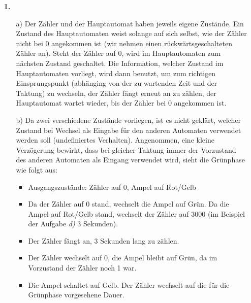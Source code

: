 \documentclass[a4paper,10pt]{scrartcl}
\author{\authorinfo}
\title{\titleinfo}
\date{\today}
\begin{document}
\setcounter{secnumdepth}{0}
\maketitle


\begin{enumerate}
    \item[\textbf{1.}]
        \begin{enumerate}
            \item[a)]
                Der Zähler und der Hauptautomat haben jeweils eigene Zustände. Ein Zustand des Hauptautomaten weist solange auf sich selbst, wie der Zähler nicht bei 0 angekommen ist (wir nehmen einen rückwärtsgeschalteten Zähler an). Steht der Zähler auf 0, wird im Hauptautomaten zum nächsten Zustand geschaltet. Die Information, welcher Zustand im Hauptautomaten vorliegt, wird dann benutzt, um zum richtigen Einsprungspunkt (abhänging von der zu wartenden Zeit und der Taktung) zu wechseln, der Zähler fängt erneut an zu zählen, der Hauptautomat wartet wieder, bis der Zähler bei 0 angekommen ist.

            \item[b)]
                Da zwei verschiedene Zustände vorliegen, ist es nicht geklärt, welcher Zustand bei Wechsel als Eingabe für den anderen Automaten verwendet werden soll (undefiniertes Verhalten). Angenommen, eine kleine Verzögerung bewirkt, dass bei gleicher Taktung immer der Vorzustand des anderen Automaten als Eingang verwendet wird, sieht die Grünphase wie folgt aus:

                \begin{itemize}
                    \item Ausgangszustände: Zähler auf 0, Ampel auf Rot/Gelb
                    \item Da der Zähler auf 0 stand, wechselt die Ampel auf Grün. Da die Ampel auf Rot/Gelb stand, wechselt der Zähler auf 3000 (im Beispiel der Aufgabe \emph{d)} 3 Sekunden).
                    \item Der Zähler fängt an, 3 Sekunden lang zu zählen.
                    \item Der Zähler wechselt auf 0, die Ampel bleibt auf Grün, da im Vorzustand der Zähler noch 1 war.
                    \item Die Ampel schaltet auf Gelb. Der Zähler wechselt auf die für die Grünphase vorgesehene Dauer.
                \end{itemize}


\end{enumerate}
\end{enumerate}
\end{document}
